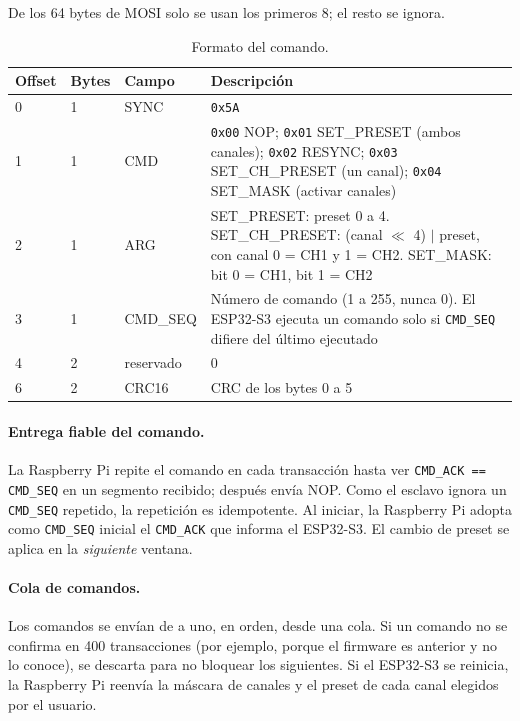 \documentclass[12pt,a4paper]{article}
\begin{document}
De los 64 bytes de MOSI solo se usan los primeros 8; el resto se ignora.

\begin{table}[H]
\centering
\small
\begin{tabular}{@{}p{1.5cm} p{1.4cm} p{2.4cm} p{9.2cm}@{}}
\toprule
\textbf{Offset} & \textbf{Bytes} & \textbf{Campo} & \textbf{Descripción} \\
\midrule
0 & 1 & SYNC    & \texttt{0x5A} \\
1 & 1 & CMD     & \texttt{0x00} NOP; \texttt{0x01} SET\_PRESET (ambos canales); \texttt{0x02} RESYNC; \texttt{0x03} SET\_CH\_PRESET (un canal); \texttt{0x04} SET\_MASK (activar canales) \\
2 & 1 & ARG     & SET\_PRESET: preset 0 a 4. SET\_CH\_PRESET: (canal $\ll$ 4) $|$ preset, con canal 0 = CH1 y 1 = CH2. SET\_MASK: bit 0 = CH1, bit 1 = CH2 \\
3 & 1 & CMD\_SEQ & Número de comando (1 a 255, nunca 0). El ESP32-S3 ejecuta un comando solo si \texttt{CMD\_SEQ} difiere del último ejecutado \\
4 & 2 & reservado & 0 \\
6 & 2 & CRC16   & CRC de los bytes 0 a 5 \\
\bottomrule
\end{tabular}
\caption{Formato del comando.}
\end{table}

\paragraph{Entrega fiable del comando.} La Raspberry Pi repite el comando en cada transacción hasta ver \texttt{CMD\_ACK == CMD\_SEQ} en un segmento recibido; después envía NOP. Como el esclavo ignora un \texttt{CMD\_SEQ} repetido, la repetición es idempotente. Al iniciar, la Raspberry Pi adopta como \texttt{CMD\_SEQ} inicial el \texttt{CMD\_ACK} que informa el ESP32-S3. El cambio de preset se aplica en la \emph{siguiente} ventana.

\paragraph{Cola de comandos.} Los comandos se envían de a uno, en orden, desde una cola. Si un comando no se confirma en 400 transacciones (por ejemplo, porque el firmware es anterior y no lo conoce), se descarta para no bloquear los siguientes. Si el ESP32-S3 se reinicia, la Raspberry Pi reenvía la máscara de canales y el preset de cada canal elegidos por el usuario.
\end{document}
